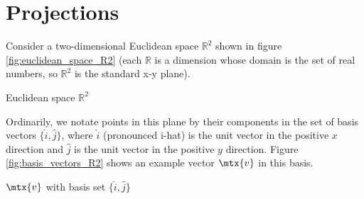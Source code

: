 \section{Projections}

Consider a two-dimensional Euclidean space $\mathbb{R}^2$ shown in figure
\ref{fig:euclidean_space_R2} (each $\mathbb{R}$ is a dimension whose domain is
the set of real numbers, so $\mathbb{R}^2$ is the standard x-y plane).
\begin{bookfigure}

  \caption{Euclidean space $\mathbb{R}^2$}
  \label{fig:euclidean_space_R2}
\end{bookfigure}

Ordinarily, we notate points in this plane by their components in the set of
basis vectors $\{\hat{i}, \hat{j}\}$, where $\hat{i}$ (pronounced i-hat) is the
unit vector in the positive $x$ direction and $\hat{j}$ is the unit vector in
the positive $y$ direction. Figure \ref{fig:basis_vectors_R2} shows an example
vector $\mtx{v}$ in this basis.
\begin{bookfigure}

  \caption{$\mtx{v}$ with basis set $\{\hat{i}, \hat{j}\}$}
  \label{fig:basis_vectors_R2}
\end{bookfigure}

